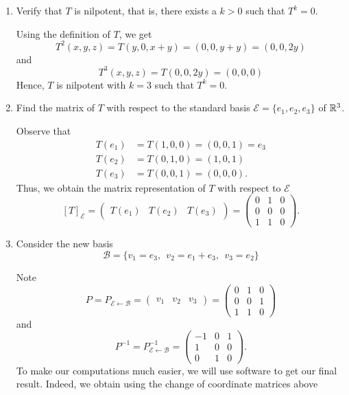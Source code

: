 \documentclass[a4paper]{article}
\begin{document}
\begin{enumerate}
    \item Verify that \( T  \) is nilpotent, that is, there exists a \( k > 0  \) such that \( T^{k } = 0  \).
        \begin{solution}
            Using the definition of \( T  \), we get
            \[  T^{2}(x,y,z) = T(y,0,x + y) = (0 , 0 , y + y ) = (0 , 0, 2y) \]
            and
            \[  T^{3}(x,y,z) = T(0,0,2y) = (0,0,0) \]
            Hence, \( T  \) is nilpotent with \( k = 3  \) such that \( T^{k} = 0  \).
        \end{solution}
    \item Find the matrix of \( T  \) with respect to the standard basis \( \mathcal{E}= \{  {e}_{1}, {e}_{2}, {e}_{3} \}  \) of \( \mathbb{R}^{3} \). 
        \begin{solution}
        Observe that 
        \begin{align*}
            T({e}_{1}) &= T(1,0,0) = (0,0,1) = {e}_{3} \\
            T({e}_{2}) &= T(0,1,0) = (1,0,1)  \\
            T({e}_{3}) &= T(0,0,1) = (0,0,0).
        \end{align*}
        Thus, we obtain the matrix representation of \( T  \) with respect to \( \mathcal{E} \)
        \[ [T]_{\mathcal{E}}^{}  = \begin{pmatrix}  T({e}_{1}) & T({e}_{2}) & T({e}_{3}) \end{pmatrix} = \begin{pmatrix}  0 & 1 & 0 \\ 0 & 0 & 0 \\ 1 & 1 & 0 \end{pmatrix}.  \]
        \end{solution}
    \item Consider the new basis 
        \[  \mathcal{B } = \{  {v}_{1}  = {e}_{3} , \ \ {v}_{2} = {e}_{1} + {e}_{3}, \ \  {v}_{3} = {e}_{2} \}  \]
        \begin{solution}
            Note \[ P = {P}_{\mathcal{E} \leftarrow \mathcal{B}} = \begin{pmatrix}  {v}_{1} & {v}_{2} & {v}_{3} \end{pmatrix}  = \begin{pmatrix}  0 & 1 & 0 \\ 0 & 0 & 1 \\ 1 & 1 & 0  \end{pmatrix}   \]
            and
            \[  P^{-1} = {P}_{\mathcal{E} \leftarrow \mathcal{B}}^{-1} = \begin{pmatrix}  - 1 & 0 & 1  \\ 1 & 0 & 0  \\ 0 & 1 & 0  \end{pmatrix}. \]
            To make our computations much easier, we will use software to get our final result. Indeed, we obtain using the change of coordinate matrices above


\end{solution}
\end{enumerate}
\end{document}

